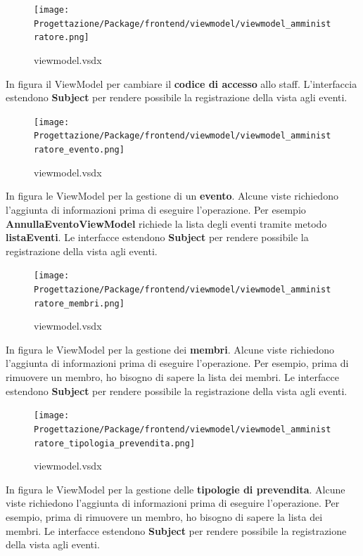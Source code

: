 \documentclass[a4paper]{article}
\begin{document}
\begin{figure}[H]
    \texttt{[image: Progettazione/Package/frontend/viewmodel/viewmodel\_amministratore.png]}
    \centering
    \caption{viewmodel.vsdx}
\end{figure}

In figura il ViewModel per cambiare il \textbf{codice di accesso} allo staff. L'interfaccia estendono \textbf{Subject} per rendere possibile la registrazione della vista agli eventi.

\begin{figure}[H]
    \texttt{[image: Progettazione/Package/frontend/viewmodel/viewmodel\_amministratore\_evento.png]}
    \centering
    \caption{viewmodel.vsdx}
\end{figure}

In figura le ViewModel per la gestione di un \textbf{evento}. Alcune viste richiedono l'aggiunta di informazioni prima di eseguire l'operazione. Per esempio \textbf{AnnullaEventoViewModel} richiede la lista degli eventi tramite metodo \textbf{listaEventi}. Le interfacce estendono \textbf{Subject} per rendere possibile la registrazione della vista agli eventi.

\begin{figure}[H]
    \texttt{[image: Progettazione/Package/frontend/viewmodel/viewmodel\_amministratore\_membri.png]}
    \centering
    \caption{viewmodel.vsdx}
\end{figure}

In figura le ViewModel per la gestione dei \textbf{membri}. Alcune viste richiedono l'aggiunta di informazioni prima di eseguire l'operazione. Per esempio, prima di rimuovere un membro, ho bisogno di sapere la lista dei membri. Le interfacce estendono \textbf{Subject} per rendere possibile la registrazione della vista agli eventi.

\begin{figure}[H]
    \texttt{[image: Progettazione/Package/frontend/viewmodel/viewmodel\_amministratore\_tipologia\_prevendita.png]}
    \centering
    \caption{viewmodel.vsdx}
\end{figure}

In figura le ViewModel per la gestione delle \textbf{tipologie di prevendita}. Alcune viste richiedono l'aggiunta di informazioni prima di eseguire l'operazione. Per esempio, prima di rimuovere un membro, ho bisogno di sapere la lista dei membri. Le interfacce estendono \textbf{Subject} per rendere possibile la registrazione della vista agli eventi.

\newpage
\end{document}
